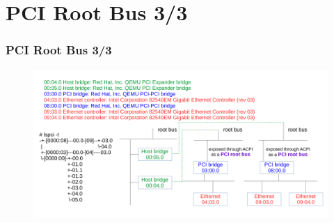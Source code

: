 \documentclass[aspectratio=169]{beamer}
\begin{document}
\section{PCI Root Bus 3/3}
\begin{frame}
\frametitle{PCI Root Bus 3/3}
\begin{figure}
\includegraphics[width=1.0\linewidth]{figures/pci-primary.pdf}
\end{figure}
\end{frame}

\end{document}

